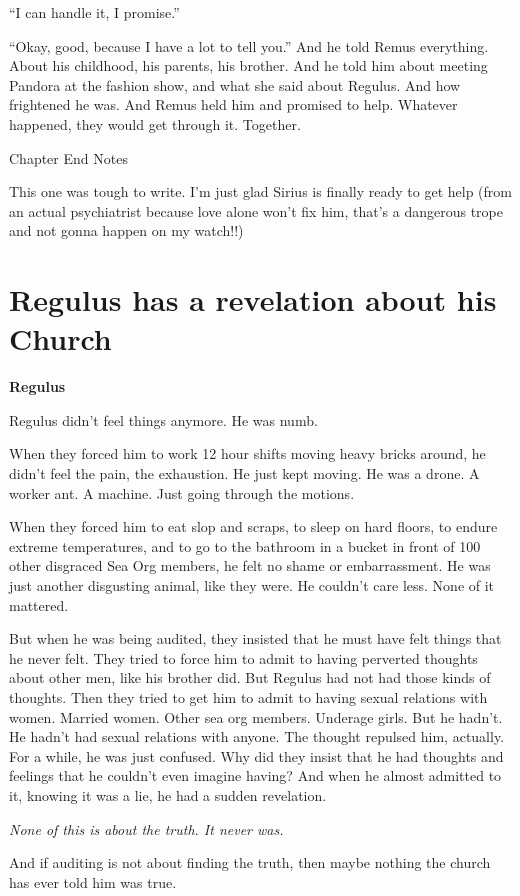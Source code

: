 \documentclass[12pt,twoside,openright]{memoir}
\begin{document}
``I can handle it, I promise.''

``Okay, good, because I have a lot to tell you.'' And he told Remus everything. About his childhood, his parents, his brother. And he told him about meeting Pandora at the fashion show, and what she said about Regulus. And how frightened he was. And Remus held him and promised to help. Whatever happened, they would get through it. Together.

Chapter End Notes

This one was tough to write. I'm just glad Sirius is finally ready to get help (from an actual psychiatrist because love alone won't fix him, that's a dangerous trope and not gonna happen on my watch!!)
\chapter{Regulus has a revelation about his Church}

\textbf{Regulus} 

Regulus didn't feel things anymore. He was numb.

When they forced him to work 12 hour shifts moving heavy bricks around, he didn't feel the pain, the exhaustion. He just kept moving. He was a drone. A worker ant. A machine. Just going through the motions.

When they forced him to eat slop and scraps, to sleep on hard floors, to endure extreme temperatures, and to go to the bathroom in a bucket in front of 100 other disgraced Sea Org members, he felt no shame or embarrassment. He was just another disgusting animal, like they were. He couldn't care less. None of it mattered.

But when he was being audited, they insisted that he must have felt things that he never felt. They tried to force him to admit to having perverted thoughts about other men, like his brother did. But Regulus had not had those kinds of thoughts. Then they tried to get him to admit to having sexual relations with women. Married women. Other sea org members. Underage girls. But he hadn't. He hadn't had sexual relations with anyone. The thought repulsed him, actually. For a while, he was just confused. Why did they insist that he had thoughts and feelings that he couldn't even imagine having? And when he almost admitted to it, knowing it was a lie, he had a sudden revelation. 

\textit{None of this is about the truth. It never was.} 

And if auditing is not about finding the truth, then maybe nothing the church has ever told him was true. 
\end{document}
